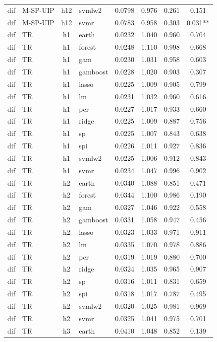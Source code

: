 \begin{ThreePartTable}
\begin{longtable}[t]{llclcccc}
dif & M-SP-UIP & h12 & svmlw2 & 0.0798 & 0.976 & 0.261 & 0.151\\
dif & M-SP-UIP & h12 & svmr & 0.0783 & 0.958 & 0.303 & 0.031**\\
\addlinespace
dif & TR & h1 & earth & 0.0232 & 1.040 & 0.960 & 0.704\\
dif & TR & h1 & forest & 0.0248 & 1.110 & 0.998 & 0.668\\
dif & TR & h1 & gam & 0.0230 & 1.031 & 0.958 & 0.603\\
dif & TR & h1 & gamboost & 0.0228 & 1.020 & 0.903 & 0.307\\
dif & TR & h1 & lasso & 0.0225 & 1.009 & 0.905 & 0.799\\
dif & TR & h1 & lm & 0.0231 & 1.032 & 0.960 & 0.616\\
dif & TR & h1 & pcr & 0.0227 & 1.017 & 0.933 & 0.660\\
dif & TR & h1 & ridge & 0.0225 & 1.009 & 0.887 & 0.756\\
dif & TR & h1 & sp & 0.0225 & 1.007 & 0.843 & 0.638\\
dif & TR & h1 & spi & 0.0226 & 1.011 & 0.927 & 0.836\\
dif & TR & h1 & svmlw2 & 0.0225 & 1.006 & 0.912 & 0.843\\
dif & TR & h1 & svmr & 0.0234 & 1.047 & 0.996 & 0.902\\
\addlinespace
dif & TR & h2 & earth & 0.0340 & 1.088 & 0.851 & 0.471\\
dif & TR & h2 & forest & 0.0344 & 1.100 & 0.986 & 0.190\\
dif & TR & h2 & gam & 0.0327 & 1.046 & 0.922 & 0.558\\
dif & TR & h2 & gamboost & 0.0331 & 1.058 & 0.947 & 0.456\\
dif & TR & h2 & lasso & 0.0323 & 1.033 & 0.971 & 0.911\\
dif & TR & h2 & lm & 0.0335 & 1.070 & 0.978 & 0.886\\
dif & TR & h2 & pcr & 0.0319 & 1.019 & 0.880 & 0.700\\
dif & TR & h2 & ridge & 0.0324 & 1.035 & 0.965 & 0.907\\
dif & TR & h2 & sp & 0.0316 & 1.011 & 0.831 & 0.659\\
dif & TR & h2 & spi & 0.0318 & 1.017 & 0.787 & 0.495\\
dif & TR & h2 & svmlw2 & 0.0320 & 1.025 & 0.981 & 0.969\\
dif & TR & h2 & svmr & 0.0325 & 1.041 & 0.975 & 0.701\\
\addlinespace
dif & TR & h3 & earth & 0.0410 & 1.048 & 0.852 & 0.139\\

\end{longtable}
\end{ThreePartTable}
